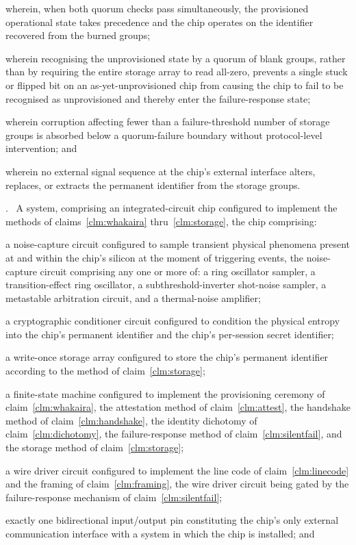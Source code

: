 \documentclass[12pt,letterpaper]{article}
\newcounter{claim}
\newcommand{\claim}[1]{\medskip\par\refstepcounter{claim}\noindent\arabic{claim}.~\label{clm:#1}\ignorespaces}
\newcommand{\clm}[1]{claim~\ref{clm:#1}}
\newcounter{fig}
\begin{document}
wherein, when both quorum checks pass simultaneously, the provisioned operational state takes precedence and the chip operates on the identifier recovered from the burned groups;

wherein recognising the unprovisioned state by a quorum of blank groups, rather than by requiring the entire storage array to read all-zero, prevents a single stuck or flipped bit on an as-yet-unprovisioned chip from causing the chip to fail to be recognised as unprovisioned and thereby enter the failure-response state;

wherein corruption affecting fewer than a failure-threshold number of storage groups is absorbed below a quorum-failure boundary without protocol-level intervention; and

wherein no external signal sequence at the chip's external interface alters, replaces, or extracts the permanent identifier from the storage groups.

\claim{system} A system, comprising an integrated-circuit chip configured to implement the methods of claims~\ref{clm:whakaira} thru~\ref{clm:storage}, the chip comprising:

a noise-capture circuit configured to sample transient physical phenomena present at and within the chip's silicon at the moment of triggering events, the noise-capture circuit comprising any one or more of: a ring oscillator sampler, a transition-effect ring oscillator, a subthreshold-inverter shot-noise sampler, a metastable arbitration circuit, and a thermal-noise amplifier;

a cryptographic conditioner circuit configured to condition the physical entropy into the chip's permanent identifier and the chip's per-session secret identifier;

a write-once storage array configured to store the chip's permanent identifier according to the method of \clm{storage};

a finite-state machine configured to implement the provisioning ceremony of \clm{whakaira}, the attestation method of \clm{attest}, the handshake method of \clm{handshake}, the identity dichotomy of \clm{dichotomy}, the failure-response method of \clm{silentfail}, and the storage method of \clm{storage};

a wire driver circuit configured to implement the line code of \clm{linecode} and the framing of \clm{framing}, the wire driver circuit being gated by the failure-response mechanism of \clm{silentfail};

exactly one bidirectional input/output pin constituting the chip's only external communication interface with a system in which the chip is installed; and
\end{document}
